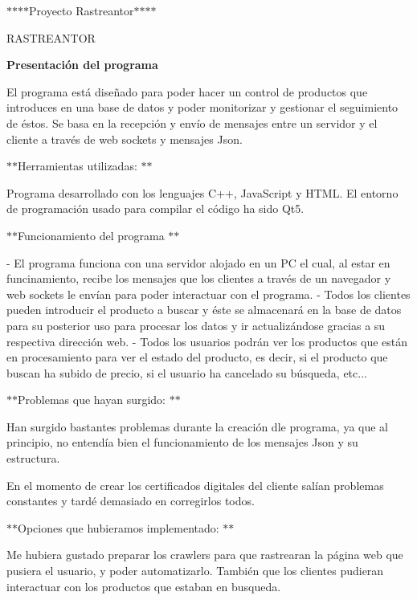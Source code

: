 

 $\ast$$\ast$$\ast$$\ast$\+Proyecto Rastreantor$\ast$$\ast$$\ast$$\ast$ 



R\+A\+S\+T\+R\+E\+A\+N\+T\+OR

{\bfseries Presentación del programa}

El programa está diseñado para poder hacer un control de productos que introduces en una base de datos y poder monitorizar y gestionar el seguimiento de éstos. Se basa en la recepción y envío de mensajes entre un servidor y el cliente a través de web sockets y mensajes Json.

$\ast$$\ast$\+Herramientas utilizadas\+: $\ast$$\ast$

Programa desarrollado con los lenguajes C++, Java\+Script y H\+T\+ML. El entorno de programación usado para compilar el código ha sido Qt5.

$\ast$$\ast$\+Funcionamiento del programa $\ast$$\ast$ \begin{DoxyVerb}- El programa funciona con una servidor alojado en un PC el cual, al estar en funcinamiento, recibe los mensajes
que los clientes a través de un navegador y web sockets le envían para poder interactuar con el programa.
- Todos los clientes pueden introducir el producto a buscar y éste se almacenará en la base de datos para su
posterior uso para procesar los datos y ir actualizándose gracias a su respectiva dirección web. 
- Todos los usuarios podrán ver los productos que están en procesamiento para ver el estado del producto, es decir,
si el producto que buscan ha subido de precio, si el usuario ha cancelado su búsqueda, etc...
\end{DoxyVerb}


$\ast$$\ast$\+Problemas que hayan surgido\+: $\ast$$\ast$


\begin{DoxyItemize}
\item Han surgido bastantes problemas durante la creación dle programa, ya que al principio, no entendía bien el funcionamiento de los mensajes Json y su estructura.
\item En el momento de crear los certificados digitales del cliente salían problemas constantes y tardé demasiado en corregirlos todos.
\end{DoxyItemize}

$\ast$$\ast$\+Opciones que hubieramos implementado\+: $\ast$$\ast$

Me hubiera gustado preparar los crawlers para que rastrearan la página web que pusiera el usuario, y poder automatizarlo. También que los clientes pudieran interactuar con los productos que estaban en busqueda.

